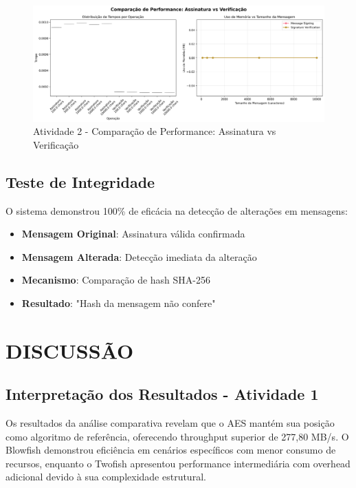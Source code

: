 \documentclass[12pt,a4paper,oneside]{article}
\begin{document}
\begin{figure}[H]
\centering
\includegraphics[width=\textwidth]{atividade2/results/signature_operations_comparison.png}
\caption{Atividade 2 - Comparação de Performance: Assinatura vs Verificação}
\label{fig:signature_comparison}
\end{figure}

\subsection{Teste de Integridade}

O sistema demonstrou 100\% de eficácia na detecção de alterações em mensagens:

\begin{itemize}
    \item \textbf{Mensagem Original}: Assinatura válida confirmada
    \item \textbf{Mensagem Alterada}: Detecção imediata da alteração
    \item \textbf{Mecanismo}: Comparação de hash SHA-256
    \item \textbf{Resultado}: "Hash da mensagem não confere"
\end{itemize}

\section{DISCUSSÃO}

\subsection{Interpretação dos Resultados - Atividade 1}

Os resultados da análise comparativa revelam que o AES mantém sua posição como algoritmo de referência, oferecendo throughput superior de 277,80 MB/s. O Blowfish demonstrou eficiência em cenários específicos com menor consumo de recursos, enquanto o Twofish apresentou performance intermediária com overhead adicional devido à sua complexidade estrutural.
\end{document}
